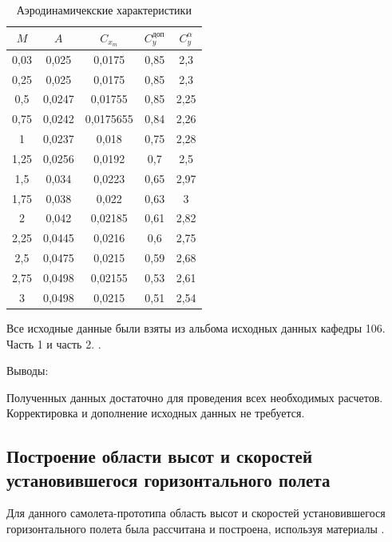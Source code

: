 \begin{table}[H]
    \centering
    \caption{Аэродинамичекские характеристики }
    \label{tab:Аэродинамичекские характеристики }
    \begin{tabular}{|c||c|c|c|c|}
    \hline
        $M$  & $A$  & $C_{x_{m}}$  & $C_y^{\text{доп}}$  & $C_y^{\alpha}$   \\ \hline \hline
        0,03  & 0,025  & 0,0175  & 0,85  & 2,3   \\ \hline
        0,25  & 0,025  & 0,0175  & 0,85  & 2,3  \\ \hline
        0,5  & 0,0247  & 0,01755  & 0,85  & 2,25  \\ \hline
        0,75  & 0,0242  & 0,0175655  & 0,84  & 2,26  \\ \hline
        1  & 0,0237  & 0,018  & 0,75  & 2,28  \\ \hline
        1,25  & 0,0256  & 0,0192  & 0,7  & 2,5   \\ \hline
        1,5  & 0,034  & 0,0223  & 0,65  & 2,97  \\ \hline
        1,75  & 0,038  & 0,022  & 0,63  & 3  \\ \hline
        2  & 0,042  & 0,02185  & 0,61  & 2,82   \\ \hline
        2,25  & 0,0445  & 0,0216  & 0,6  & 2,75   \\ \hline
        2,5  & 0,0475  & 0,0215  & 0,59  & 2,68  \\ \hline
        2,75  & 0,0498  & 0,02155  & 0,53  & 2,61   \\ \hline
        3 & 0,0498  & 0,0215  & 0,51  & 2,54   \\ \hline
    \end{tabular}
\end{table}

Все исходные данные были взяты из альбома исходных данных кафедры 106. Часть 1 и часть 2. \textit{\cite{Album}}.
\begin{center}
    Выводы:
\end{center}

Полученных данных достаточно для проведения всех необходимых расчетов. Корректировка и дополнение исходных данных не требуется. 

\subsection{Построение области высот и скоростей установившегося горизонтального полета }

Для данного самолета-прототипа область высот и скоростей установившегося горизонтального полета была рассчитана и построена, используя материалы \cite{EfremovBig}.

